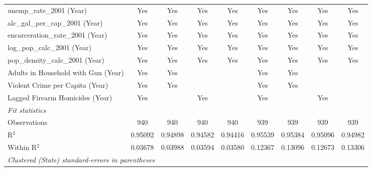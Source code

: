 \begin{tabular}{lcccccccc}
   unemp\_rate\_2001 (Year)            & Yes              & Yes              & Yes              & Yes              & Yes              & Yes              & Yes              & Yes\\  
   alc\_gal\_per\_cap\_2001 (Year)     & Yes              & Yes              & Yes              & Yes              & Yes              & Yes              & Yes              & Yes\\  
   encarceration\_rate\_2001 (Year)    & Yes              & Yes              & Yes              & Yes              & Yes              & Yes              & Yes              & Yes\\  
   log\_pop\_calc\_2001 (Year)         & Yes              & Yes              & Yes              & Yes              & Yes              & Yes              & Yes              & Yes\\  
   pop\_density\_calc\_2001 (Year)     & Yes              & Yes              & Yes              & Yes              & Yes              & Yes              & Yes              & Yes\\  
   Adults in Household with Gun (Year) & Yes              & Yes              &                  &                  & Yes              & Yes              &                  & \\  
   Violent Crime per Capita (Year)     & Yes              & Yes              &                  &                  & Yes              & Yes              &                  & \\  
   Lagged Firearm Homicides (Year)     & Yes              &                  & Yes              &                  & Yes              &                  & Yes              & \\  
   \midrule
   \emph{Fit statistics}\\
   Observations                        & 940              & 940              & 940              & 940              & 939              & 939              & 939              & 939\\  
   R$^2$                               & 0.95092          & 0.94898          & 0.94582          & 0.94416          & 0.95539          & 0.95384          & 0.95096          & 0.94982\\  
   Within R$^2$                        & 0.03678          & 0.03988          & 0.03594          & 0.03580          & 0.12367          & 0.13096          & 0.12673          & 0.13306\\  
   \midrule \midrule
   \multicolumn{9}{l}{\emph{Clustered (State) standard-errors in parentheses}}\\
\end{tabular}
\par\endgroup


